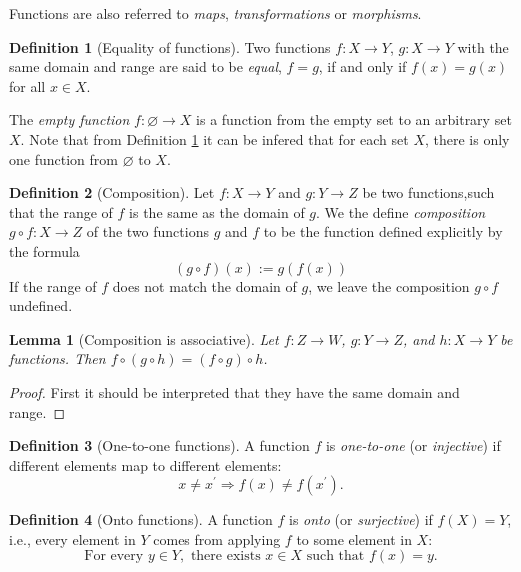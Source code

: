 \documentclass[
]{book}
\newtheorem{lemma}{Lemma}[chapter]
\theoremstyle{definition}
\newtheorem{definition}{Definition}[chapter]
\theoremstyle{definition}
\theoremstyle{definition}
\theoremstyle{definition}
\theoremstyle{remark}
\begin{document}
Functions are also referred to \emph{maps}, \emph{transformations} or \emph{morphisms}.

\begin{definition}[Equality of functions]
\protect\hypertarget{def:feq}{}\label{def:feq}Two functions \(f:X\to Y\), \(g:X\to Y\) with the same domain and range are said to be \emph{equal}, \(f=g\), if and only if \(f(x) = g(x)\) for all \(x\in X\).
\end{definition}

The \emph{empty function} \(f:\varnothing\to X\) is a function from the empty set to an arbitrary set \(X\). Note that from Definition \ref{def:feq} it can be infered that for each set \(X\), there is only one function from \(\varnothing\) to \(X\).

\begin{definition}[Composition]
Let \(f: X\to Y\) and \(g:Y\to Z\) be two functions,such that the range of \(f\) is the same as the domain of \(g\). We the define \emph{composition} \(g \circ f:X\to Z\) of the two functions \(g\) and \(f\) to be the function defined explicitly by the formula
\[
(g\circ f)(x):= g(f(x))
\]
If the range of \(f\) does not match the domain of \(g\), we leave the composition \(g\circ f\) undefined.
\end{definition}

\begin{lemma}[Composition is associative]
Let \(f:Z\to W\), \(g:Y\to Z\), and \(h:X\to Y\) be functions. Then \(f\circ(g\circ h) = (f\circ g)\circ h\).
\end{lemma}

\begin{proof}
First it should be interpreted that they have the same domain and range.
\end{proof}

\begin{definition}[One-to-one functions]
\protect\hypertarget{def:inj}{}\label{def:inj}A function \(f\) is \emph{one-to-one} (or \emph{injective}) if different elements map to different elements:
\[
x\ne x^{\prime} \Longrightarrow f(x) \ne f(x^{\prime}).
\]
\end{definition}

\begin{definition}[Onto functions]
\protect\hypertarget{def:surj}{}\label{def:surj}A function \(f\) is \emph{onto} (or \emph{surjective}) if \(f(X)=Y\), i.e., every element in \(Y\) comes from applying \(f\) to some element in \(X\):
\[
\text{For every }y\in Y,\text{ there exists }x\in X \text{ such that }f(x) = y.
\]
\end{definition}
\end{document}
